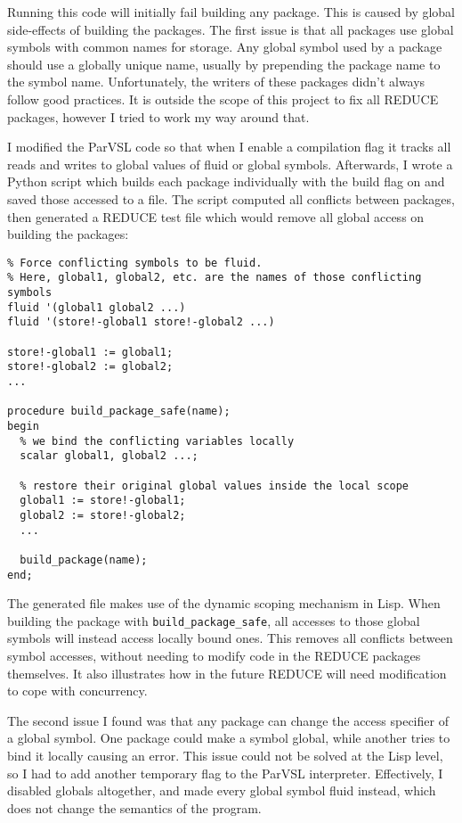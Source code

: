 Running this code will initially fail building any package. This is caused
by global side-effects of building the packages. The first issue is that all
packages use global symbols with common names for storage. Any global
symbol used by a package should use a globally unique name, usually by prepending
the package name to the symbol name. Unfortunately, the writers of these packages
didn't always follow good practices. It is outside the scope of this project to
fix all REDUCE packages, however I tried to work my way around that.

I modified the ParVSL code so that when I enable a compilation flag it tracks all
reads and writes to global values of fluid or global symbols. Afterwards, I wrote a Python
script which builds each package individually with the build flag on and saved those
accessed to a file. The script computed all conflicts between packages,
then generated a REDUCE test file which would remove all global access on building the packages:

\begin{verbatim}
% Force conflicting symbols to be fluid.
% Here, global1, global2, etc. are the names of those conflicting symbols
fluid '(global1 global2 ...)
fluid '(store!-global1 store!-global2 ...)

store!-global1 := global1;
store!-global2 := global2;
...

procedure build_package_safe(name);
begin
  % we bind the conflicting variables locally
  scalar global1, global2 ...;

  % restore their original global values inside the local scope
  global1 := store!-global1;
  global2 := store!-global2;
  ...

  build_package(name);
end;
\end{verbatim}

The generated file makes use of the dynamic scoping mechanism in Lisp. When building the package
with \texttt{build\_package\_safe}, all accesses to those global symbols will instead access locally
bound ones. This removes all conflicts between symbol accesses, without needing to modify code in
the REDUCE packages themselves. It also illustrates how in the future REDUCE will need modification
to cope with concurrency.

The second issue I found was that any package can change the access specifier of a global symbol.
One package could make a symbol global, while another tries to bind it locally causing an error.
This issue could not be solved at the Lisp level, so I had to add another temporary flag to the
ParVSL interpreter. Effectively, I disabled globals altogether, and made every global symbol
fluid instead, which does not change the semantics of the program.

